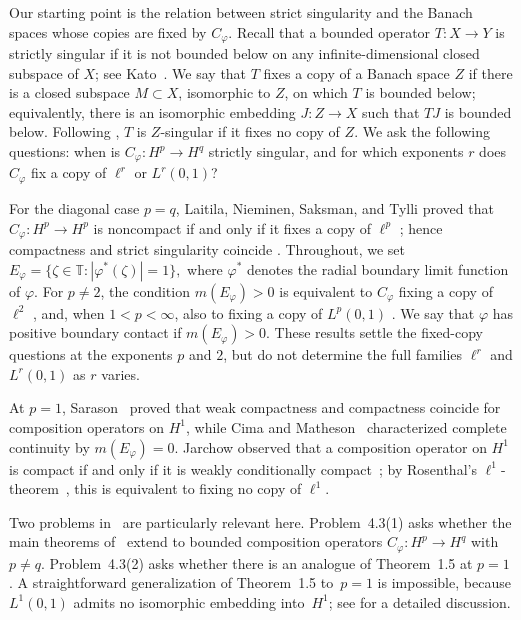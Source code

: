 \documentclass[10pt,a4paper]{amsart}
\newcommand{\T}{\mathbb{T}}
\begin{document}
Our starting point is the relation between strict singularity and the
Banach spaces whose copies are fixed by \(C_\varphi\). Recall that a
bounded operator \(T:X\to Y\) is strictly singular if it is not bounded
below on any infinite-dimensional closed subspace of \(X\); see
Kato~\cite{Kato1958}. We say that \(T\) fixes a copy of a Banach space \(Z\) if there is a
closed subspace \(M\subset X\), isomorphic to \(Z\), on which \(T\)
is bounded below; equivalently, there is an isomorphic embedding
\(J:Z\to X\) such that \(TJ\) is bounded below. Following
\cite{LNST2017}, \(T\) is \(Z\)-singular if it fixes no copy of \(Z\). We ask the following questions: when is
\(C_\varphi:H^p\to H^q\) strictly singular, and for which exponents
\(r\) does \(C_\varphi\) fix a copy of \(\ell^r\) or \(L^r(0,1)\)?



For the diagonal case \(p=q\), Laitila, Nieminen, Saksman, and Tylli
proved that \(C_\varphi:H^p\to H^p\) is noncompact if and only if it
fixes a copy of \(\ell^p\)
\cite[Theorem~1.2]{LNST2017}; hence compactness and strict
singularity coincide
\cite[Corollary~1.3]{LNST2017}. Throughout, we set
\(
E_{\varphi}=\{\zeta\in\T:|\varphi^{*}(\zeta)|=1\},
\)
where \(\varphi^*\) denotes the radial boundary limit function of
\(\varphi\). For \(p\ne2\), the condition \(m(E_\varphi)>0\) is
equivalent to \(C_\varphi\) fixing a copy of \(\ell^2\)
\cite[Theorem~1.4]{LNST2017}, and, when \(1<p<\infty\), also to
fixing a copy of \(L^p(0,1)\)
\cite[Theorem~1.5]{LNST2017}. We say that \(\varphi\) has positive
boundary contact if \(m(E_\varphi)>0\). These results settle the
fixed-copy questions at the exponents \(p\) and \(2\), but do not
determine the full families \(\ell^r\) and \(L^r(0,1)\) as \(r\)
varies.

At \(p=1\), Sarason~\cite{Sarason1992} proved that weak compactness
and compactness coincide for composition operators on \(H^1\), while
Cima and Matheson~\cite{CimaMatheson1994} characterized complete
continuity by \(m(E_\varphi)=0\). Jarchow observed that a composition
operator on \(H^1\) is compact if and only if it is weakly
conditionally compact~\cite[p.~95]{Jarchow1998}; by Rosenthal's
\(\ell^1\)-theorem~\cite{Rosenthal1974}, this is equivalent to fixing
no copy of \(\ell^1\).



Two problems in~\cite{LNST2017} are particularly relevant here. Problem~4.3(1) asks whether the main theorems of~\cite{LNST2017} extend
to bounded composition operators $C_{\varphi}:H^{p}\to H^{q}$ with
$p\neq q$. Problem~4.3(2) asks whether there is an analogue of
Theorem~1.5 at \(p=1\). A straightforward
generalization of Theorem~1.5 to~$p=1$ is impossible, because $L^{1}(0,1)$
admits no isomorphic embedding into~$H^{1}$; see \cite[p.~262]{KwapienPelczynski1976} for a detailed
discussion.
\end{document}
